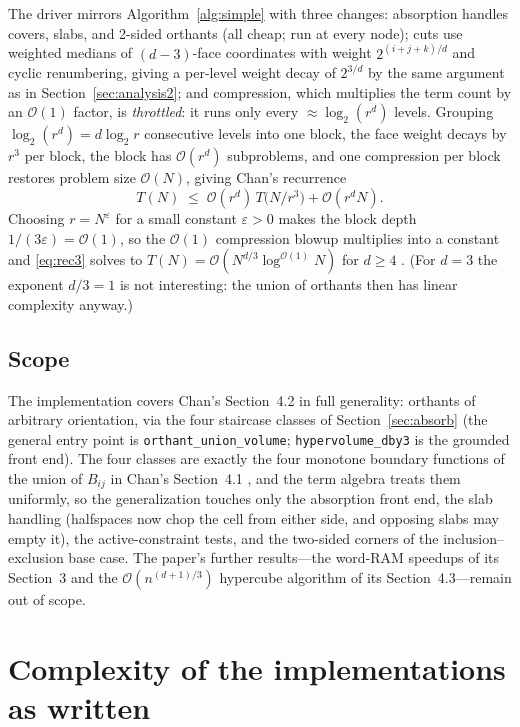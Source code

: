 \documentclass[11pt,a4paper]{article}
\theoremstyle{remark}
\newcommand{\Oh}{\mathcal{O}}
\begin{document}
The driver mirrors Algorithm~\ref{alg:simple} with three changes: absorption
handles covers, slabs, and 2-sided orthants (all cheap; run at every node);
cuts use weighted medians of $(d{-}3)$-face coordinates with weight
$2^{(i+j+k)/d}$ and cyclic renumbering, giving a per-level weight decay of
$2^{3/d}$ by the same argument as in Section~\ref{sec:analysis2}; and
compression, which multiplies the term count by an $\Oh(1)$ factor, is
\emph{throttled}: it runs only every $\approx\log_2(r^d)$ levels.  Grouping
$\log_2(r^d)=d\log_2 r$ consecutive levels into one block, the face weight
decays by $r^3$ per block, the block has $\Oh(r^d)$ subproblems, and one
compression per block restores problem size $\Oh(N)$, giving Chan's
recurrence
\begin{equation}
T(N)\;\le\;\Oh(r^d)\,T\!\bigl(N/r^3\bigr)+\Oh(r^d N).
\label{eq:rec3}
\end{equation}
Choosing $r=N^{\varepsilon}$ for a small constant $\varepsilon>0$ makes the
block depth $1/(3\varepsilon)=\Oh(1)$, so the $\Oh(1)$ compression blowup
multiplies into a constant and \eqref{eq:rec3} solves to
$T(N)=\Oh(N^{d/3}\log^{\Oh(1)}N)$ for $d\ge4$ \cite{Chan2013}.  (For $d=3$
the exponent $d/3=1$ is not interesting: the union of orthants then has
linear complexity anyway.)

\subsection{Scope}

The implementation covers Chan's Section~4.2 in full generality: orthants of
arbitrary orientation, via the four staircase classes of
Section~\ref{sec:absorb} (the general entry point is
\texttt{orthant\_union\_volume}; \texttt{hypervolume\_dby3} is the grounded
front end).  The four classes are exactly the four monotone boundary
functions of the union of $B_{ij}$ in Chan's Section~4.1
\cite[Sec.~4.1]{Chan2013}, and the term algebra treats them uniformly, so
the generalization touches only the absorption front end, the slab handling
(halfspaces now chop the cell from either side, and opposing slabs may empty
it), the active-constraint tests, and the two-sided corners of the
inclusion--exclusion base case.  The paper's further results---the word-RAM
speedups of its Section~3 and the $\Oh(n^{(d+1)/3})$ hypercube algorithm of
its Section~4.3---remain out of scope.

\section{Complexity of the implementations as written}
\label{sec:complexity}
\end{document}
